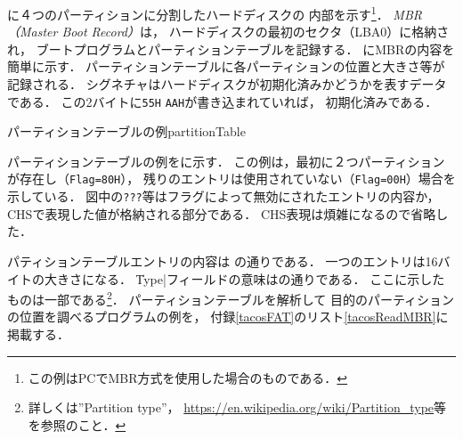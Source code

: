 \begin{enumerate}
 に４つのパーティションに分割したハードディスクの
  内部を示す\footnote{この例はPCでMBR方式を使用した場合のものである．}．
  \emph{MBR（Master Boot Record）}は，
  ハードディスクの最初のセクタ（LBA0）に格納され，
  ブートプログラムとパーティションテーブルを記録する．
  にMBRの内容を簡単に示す．
  パーティションテーブルに各パーティションの位置と大きさ等が記録される．
  シグネチャはハードディスクが初期化済みかどうかを表すデータである．
  この2バイトに\texttt{55H} \texttt{AAH}が書き込まれていれば，
  初期化済みである．
  
           {パーティションテーブルの例}{partitionTable}

  パーティションテーブルの例をに示す．
  この例は，最初に２つパーティションが存在し（\texttt{Flag=80H}），
  残りのエントリは使用されていない（\texttt{Flag=00H}）場合を示している．
  図中の\texttt{???}等はフラグによって無効にされたエントリの内容か，
  CHSで表現した値が格納される部分である．
  CHS表現は煩雑になるので省略した．

  パティションテーブルエントリの内容は
  の通りである．
  一つのエントリは16バイトの大きさになる．
  \|Type|フィールドの意味はの通りである．
  ここに示したものは一部である\footnote{
    詳しくは''Partition type''，
    \url{https://en.wikipedia.org/wiki/Partition_type}等を参照のこと．}．
  パーティションテーブルを解析して
  目的のパーティションの位置を調べるプログラムの例を，
  付録\ref{tacosFAT}のリスト\ref{tacosReadMBR}に掲載する．


\end{enumerate}
